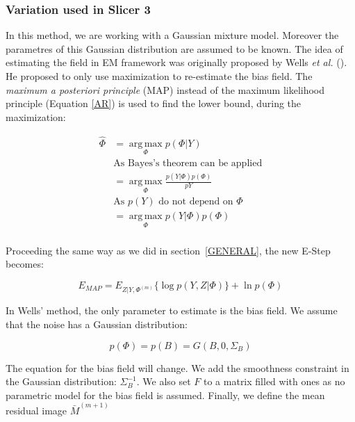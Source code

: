 \subsubsection{Variation used in Slicer 3}
In this method, we are working with a Gaussian mixture model. Moreover the parametres of this Gaussian distribution are assumed to be known. The idea of estimating the field in EM framework was originally proposed by Wells \textit{et al.} (\cite{10}). He proposed to only use maximization to re-estimate the bias field. The \textit{maximum a posteriori principle} (MAP) instead of the maximum likelihood principle (Equation \ref{AR}) is used to find the lower bound, during the maximization:

\begin{align*}\label{ARMAP}
  \hat{\Phi} &=\operatorname*{arg\,max}_\Phi p(\Phi |Y)\\
             &\mbox{As Bayes's theorem can be applied} \\
             &=\operatorname*{arg\,max}_\Phi \frac{p(Y|\Phi)p(\Phi)}{p{Y}}\\  
             &\mbox{As $p(Y)$ do not depend on $\Phi$} \\
             &=\operatorname*{arg\,max}_\Phi p(Y|\Phi)p(\Phi)\\
  \end{align*}

Proceeding the same way as we did in section~\ref{GENERAL}, the new E-Step becomes:

\begin{equation}\label{EMAP}
E_{MAP} = E_{Z|Y,\Phi^{(m)}}\{ \operatorname*{log} p(Y,Z|\Phi) \} + \operatorname*{ln} p(\Phi)
\end{equation}

In Wells' method, the only parameter to estimate is the bias field. We assume that the noise has a Gaussian distribution:

  \begin{equation*}
  p(\Phi) = p(B) = G(B,0,\Sigma_B)
  \end{equation*}
  
The equation for the bias field will change. We add the smoothness constraint in the Gaussian distribution: $\Sigma_B^{-1}$. We also set $F$ to a matrix filled with ones as no parametric model for the bias field is assumed. Finally, we define the mean residual image $\bar{M}^{(m+1)}$


